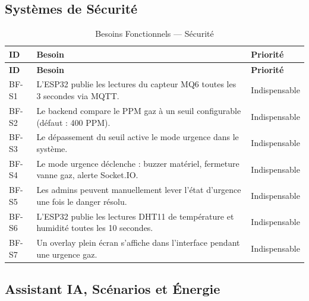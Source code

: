 \subsection{Systèmes de Sécurité}

\begin{longtable}{p{} p{} p{}}
\caption{Besoins Fonctionnels --- Sécurité}\label{tab:bf_safety}\\
\toprule
\textbf{ID} & \textbf{Besoin} & \textbf{Priorité} \\
\midrule
\endfirsthead
\toprule
\textbf{ID} & \textbf{Besoin} & \textbf{Priorité} \\
\midrule
\endhead
\bottomrule
\endfoot
BF-S1 & L'ESP32 publie les lectures du capteur MQ6 toutes les 3 secondes via MQTT. & Indispensable \\
BF-S2 & Le backend compare le PPM gaz à un seuil configurable (défaut : 400 PPM). & Indispensable \\
BF-S3 & Le dépassement du seuil active le mode urgence dans le système. & Indispensable \\
BF-S4 & Le mode urgence déclenche : buzzer matériel, fermeture vanne gaz, alerte Socket.IO. & Indispensable \\
BF-S5 & Les admins peuvent manuellement lever l'état d'urgence une fois le danger résolu. & Indispensable \\
BF-S6 & L'ESP32 publie les lectures DHT11 de température et humidité toutes les 10 secondes. & Indispensable \\
BF-S7 & Un overlay plein écran s'affiche dans l'interface pendant une urgence gaz. & Indispensable \\
\end{longtable}

\subsection{Assistant IA, Scénarios et Énergie}

